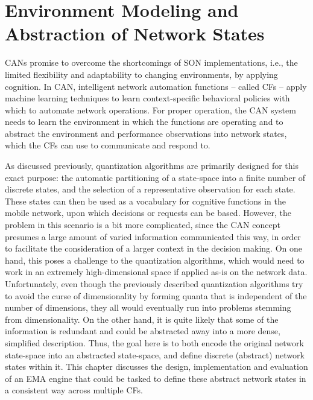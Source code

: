 \chapter{Environment Modeling and Abstraction of Network States}
	\label{cha:ema}
	
   	\acp{CAN} promise to overcome the shortcomings of \ac{SON} implementations, i.e., the limited flexibility and adaptability to changing environments, by applying cognition.
   	In \ac{CAN}, intelligent network automation functions -- called \acp{CF} -- apply machine learning techniques to learn context-specific behavioral policies with which to automate network operations.
   	For proper operation, the \ac{CAN} system needs to learn the environment in which the functions are operating and to abstract the environment and performance observations into network states, which the \acp{CF} can use to communicate and respond to.
   	
   	As discussed previously, quantization algorithms are primarily designed for this exact purpose: the automatic partitioning of a state-space into a finite number of discrete states, and the selection of a representative observation for each state.
   	These states can then be used as a vocabulary for cognitive functions in the mobile network, upon which decisions or requests can be based.
   	However, the problem in this scenario is a bit more complicated, since the \ac{CAN} concept presumes a large amount of varied information communicated this way, in order to facilitate the consideration of a larger context in the decision making.
   	On one hand, this poses a challenge to the quantization algorithms, which would need to work in an extremely high-dimensional space if applied as-is on the network data.
   	Unfortunately, even though the previously described quantization algorithms try to avoid the curse of dimensionality by forming quanta that is independent of the number of dimensions, they all would eventually run into problems stemming from dimensionality.
   	On the other hand, it is quite likely that some of the information is redundant and could be abstracted away into a more dense, simplified description.
   	Thus, the goal here is to both encode the original network state-space into an abstracted state-space, and define discrete (abstract) network states within it.
   	This chapter discusses the design, implementation and evaluation of an \ac{EMA} engine that could be tasked to define these abstract network states in a consistent way across multiple \acp{CF}.
   	
